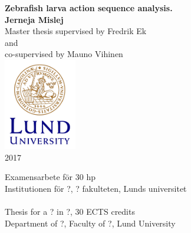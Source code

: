 \documentclass[a4paper,12pt]{article}
\begin{document}
\begin{titlepage}
\vfill
\begin{center}
{\large\bf Zebrafish larva action sequence analysis.}
\\[3cm]
{\bf Jerneja Mislej}
\\[1.5cm]
{Master thesis supervised by Fredrik Ek\\and\\co-supervised by Mauno Vihinen}
\\[4cm]
\includegraphics[height=4cm]{Lund_University_logotype.png}
\\[0.5cm]
{2017}
\\[2cm]
\end{center}
{Examensarbete för 30 hp\\
Institutionen för ?, ? fakulteten, Lunds universitet
\\
\\Thesis for a ? in ?, 30 ECTS credits
\\Department of ?, Faculty of ?, Lund University}

\end{titlepage}
\thispagestyle{empty} %

\end{document}

